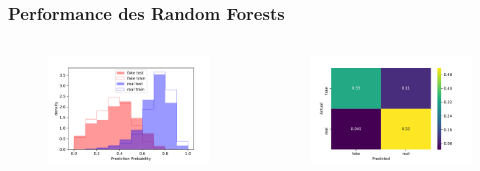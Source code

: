\documentclass[aspectratio=1610, professionalfonts, 9pt]{beamer}
\begin{document}
  \begin{frame}
    \frametitle{Performance des Random Forests}
    \begin{columns}
      \begin{figure}
          \includegraphics[width=\textwidth]{pictures/bow/RF/prob_bow_best_nn.pdf}
          \caption{}
          \label{}
      \end{figure}

      \begin{figure}
          \includegraphics[width=\textwidth]{pictures/bow/RF/cnfsn_mtx_bow_best_nn.pdf}
          \caption{}
          \label{}
      \end{figure}
    \end{columns}
  \end{frame}
\end{document}
